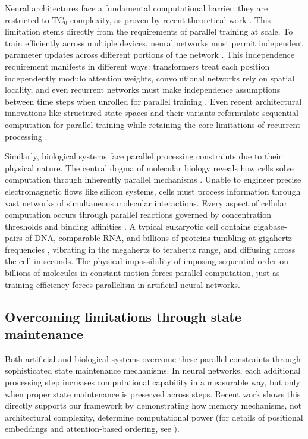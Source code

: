 \documentclass[12pt]{article}
\begin{document}
Neural architectures face a fundamental computational barrier: they are restricted to $\text{TC}_0$ complexity, as proven by recent theoretical work \cite{merrill2023parallelism,peng2024limitations}.
This limitation stems directly from the requirements of parallel training at scale.
To train efficiently across multiple devices, neural networks must permit independent parameter updates across different portions of the network \cite{barrett2019analyzing}.
This independence requirement manifests in different ways: transformers treat each position independently modulo attention weights, convolutional networks rely on spatial locality, and even recurrent networks must make independence assumptions between time steps when unrolled for parallel training \cite{dickson2023rnns}.
Even recent architectural innovations like structured state spaces and their variants reformulate sequential computation for parallel training while retaining the core limitations of recurrent processing \cite{gu2021efficiently,gu2023mamba,dao2024transformers,nguyen2024hyenadna}.

Similarly, biological systems face parallel processing constraints due to their physical nature.
The central dogma of molecular biology reveals how cells solve computation through inherently parallel mechanisms \cite{wang2023parallel,cai2024efficient,fu2023scgrn}.
Unable to engineer precise electromagnetic flows like silicon systems, cells must process information through vast networks of simultaneous molecular interactions.
Every aspect of cellular computation occurs through parallel reactions governed by concentration thresholds and binding affinities \cite{alberts2022molecular}.
A typical eukaryotic cell contains gigabase-pairs of DNA, comparable RNA, and billions of proteins \cite{milo2013protein} tumbling at gigahertz frequencies \cite{zhang2023molecular}, vibrating in the megahertz to terahertz range, and diffusing across the cell in seconds.
The physical impossibility of imposing sequential order on billions of molecules in constant motion forces parallel computation, just as training efficiency forces parallelism in artificial neural networks.

\subsection{Overcoming limitations through state maintenance}

Both artificial and biological systems overcome these parallel constraints through sophisticated state maintenance mechanisms.
In neural networks, each additional processing step increases computational capability in a measurable way, but only when proper state maintenance is preserved across steps.
Recent work shows this directly supports our framework by demonstrating how memory mechanisms, not architectural complexity, determine computational power (for details of positional embeddings and attention-based ordering, see \cite{merrill2023parallelism,merrill2024}).
\end{document}
